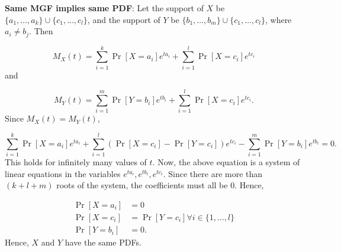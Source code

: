 \medskip\noindent\textbf{Same MGF implies same PDF}: Let the support of $X$ be 
$\{a_1, \ldots, a_k\}\cup\{c_1, \ldots, c_l\}$, and the support of $Y$ be
$\{b_1, \ldots, b_m\}\cup\{c_1, \ldots, c_l\}$, where $a_i \ne b_j$. Then

\begin{equation*}
    M_X(t) = \sum_{i=1}^{k}\Pr[X=a_i]e^{ta_i} + \sum_{i=1}^{l}\Pr[X=c_i]e^{tc_i}
\end{equation*}
and

\begin{equation*}
    M_Y(t) = \sum_{i=1}^{m}\Pr[Y=b_i]e^{tb_i} + \sum_{i=1}^{l}\Pr[X=c_i]e^{tc_i}.
\end{equation*}
Since $M_X(t)=M_Y(t)$,

\begin{equation*}
    \sum_{i=1}^{k}\Pr[X=a_i]e^{ta_i} + \sum_{i=1}^{l}
    (\Pr[X=c_i]-\Pr[Y=c_i])e^{tc_i} - \sum_{i=1}^{m}\Pr[Y=b_i]e^{tb_i} = 0.
\end{equation*}
This holds for infinitely many values of $t$. Now, the above equation is a system
of linear equations in the variables $e^{ta_i}, e^{tb_i}, e^{tc_i}$. Since there
are more than $(k+l+m)$ roots of the system, the coefficients must all be 0.
Hence,

\begin{equation*}
    \begin{aligned}
        \Pr[X=a_i] &= 0 \\
        \Pr[X=c_i] &= \Pr[Y=c_i] \forall i\in \{1, \ldots, l\} \\
        \Pr[Y=b_i] &= 0.
    \end{aligned}
\end{equation*}
Hence, $X$ and $Y$ have the same PDFs.
